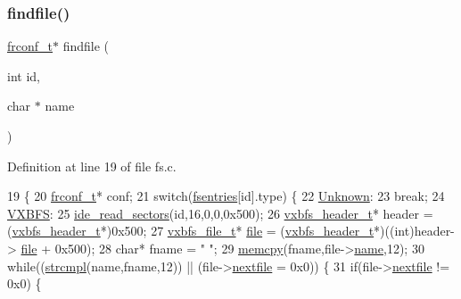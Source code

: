 \subsubsection{\texorpdfstring{findfile()}{findfile()}}
{\footnotesize\ttfamily \hyperlink{a00185_a752f1bef3c13b98d682fddc44a9e47c8_a752f1bef3c13b98d682fddc44a9e47c8}{frconf\+\_\+t}$\ast$ findfile (\begin{DoxyParamCaption}\item[{int}]{id,  }\item[{char $\ast$}]{name }\end{DoxyParamCaption})}



Definition at line 19 of file fs.\+c.


\begin{DoxyCode}
19                                        \{
20     \hyperlink{a00314}{frconf\_t}* conf;
21     \textcolor{keywordflow}{switch}(\hyperlink{a00146_a6b46131164b26e476762930c9aae4319_a6b46131164b26e476762930c9aae4319}{fsentries}[\textcolor{keywordtype}{id}].type) \{
22         \hyperlink{a00155_a2e9d0c3765a28910638672bfc746181b_a2e9d0c3765a28910638672bfc746181ba4e81c184ac3ad48a389cd4454c4a05bb}{Unknown}:
23             \textcolor{keywordflow}{break};
24         \hyperlink{a00155_a2e9d0c3765a28910638672bfc746181b_a2e9d0c3765a28910638672bfc746181bac740d3121d634c0d77f5602b1fdab236}{VXBFS}:
25             \hyperlink{a00026_a9dd84843412753d236e17a15277c5b98_a9dd84843412753d236e17a15277c5b98}{ide\_read\_sectors}(\textcolor{keywordtype}{id},16,0,0,0x500);
26             \hyperlink{a00334}{vxbfs\_header\_t}* header = (\hyperlink{a00334}{vxbfs\_header\_t}*)0x500;
27             \hyperlink{a00330}{vxbfs\_file\_t}* \hyperlink{a00298}{file} = (\hyperlink{a00334}{vxbfs\_header\_t}*)((\textcolor{keywordtype}{int})header->
      \hyperlink{a00334_a3b903de5c5034494530cdc0c2d4ff9b1_a3b903de5c5034494530cdc0c2d4ff9b1}{file} + 0x500);
28             \textcolor{keywordtype}{char}* fname = \textcolor{stringliteral}{"           "};
29             \hyperlink{a00125_a370712322c794e949c996946f2283ea8_a370712322c794e949c996946f2283ea8}{memcpy}(fname,file->\hyperlink{a00330_a07ecc9bacdc2943442f26f62f6749055_a07ecc9bacdc2943442f26f62f6749055}{name},12);
30             \textcolor{keywordflow}{while}((\hyperlink{a00119_a3c8c44ba2ae232bc5ae8449de1448164_a3c8c44ba2ae232bc5ae8449de1448164}{strcmpl}(name,fname,12)) || (file->\hyperlink{a00330_aa2c7e2e1b3827ce9fbaa045b89202784_aa2c7e2e1b3827ce9fbaa045b89202784}{nextfile} = 0x0)) \{
31                 \textcolor{keywordflow}{if}(file->\hyperlink{a00330_aa2c7e2e1b3827ce9fbaa045b89202784_aa2c7e2e1b3827ce9fbaa045b89202784}{nextfile} != 0x0) \{

\end{DoxyCode}
